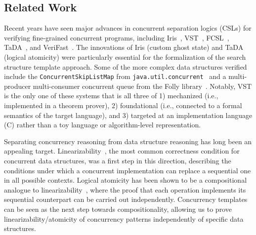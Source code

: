 \documentclass[a4paper,UKenglish,cleveref, autoref, thm-restate]{lipics-v2021}
\begin{document}
\subsection*{Related Work}
Recent years have seen major advances in concurrent separation logics (CSLs) for verifying fine-grained concurrent programs, including Iris~\cite{iris}, VST~\cite{plcc,iris-vst-arxiv}, FCSL~\cite{fcsl}, TaDA~\cite{tada}, and VeriFast~\cite{verifast-conc}. The innovations of Iris (custom ghost state) and TaDA (logical atomicity) were particularly essential for the formalization of the search structure template approach. Some of the more complex data structures verified include the \lstinline{ConcurrentSkipListMap} from \lstinline{java.util.concurrent}~\cite{Xiong2017Abstract} and a multi-producer multi-consumer concurrent queue from the Folly library~\cite{iris-folly}. Notably, VST is the only one of these systems that is all three of 1) mechanized (i.e., implemented in a theorem prover), 2) foundational (i.e., connected to a formal semantics of the target language), and 3) targeted at an implementation language (C) rather than a toy language or algorithm-level representation. %


Separating concurrency reasoning from data structure reasoning has long been an appealing target. Linearizability~\cite{linearizability}, the most common correctness condition for concurrent data structures, was a first step in this direction, describing the conditions under which a concurrent implementation can replace a sequential one in all possible contexts. Logical atomicity has been shown to be a compositional analogue to linearizability~\cite{la-lin}, where the proof that each operation implements its sequential counterpart can be carried out independently. Concurrency templates can be seen as the next step towards compositionality, allowing us to prove linearizability/atomicity of concurrency patterns independently of specific data structures.
\end{document}
